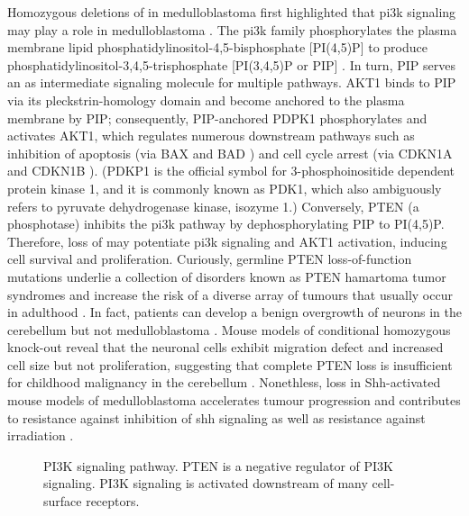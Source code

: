 Homozygous deletions of  in medulloblastoma first highlighted that \gls{pi3k} signaling  may play a role in medulloblastoma . The \gls{pi3k} family phosphorylates the plasma membrane lipid phosphatidylinositol-4,5-bisphosphate [PI(4,5)P] to produce phosphatidylinositol-3,4,5-trisphosphate [PI(3,4,5)P or PIP] . In turn, PIP serves an as intermediate signaling molecule for multiple pathways. AKT1 binds to PIP via its pleckstrin-homology domain and become anchored to the plasma membrane by PIP; consequently, PIP-anchored PDPK1 phosphorylates and activates AKT1, which regulates numerous downstream pathways such as inhibition of apoptosis (via BAX  and BAD ) and cell cycle arrest (via CDKN1A  and CDKN1B ). (PDKP1 is the official symbol for 3-phosphoinositide dependent protein kinase 1, and it is commonly known as PDK1, which also ambiguously refers to pyruvate dehydrogenase kinase, isozyme 1.) Conversely, PTEN (a phosphotase) inhibits the \gls{pi3k} pathway by dephosphorylating PIP to PI(4,5)P. Therefore, loss of  may potentiate \gls{pi3k} signaling and AKT1 activation, inducing cell survival and proliferation. Curiously, germline PTEN loss-of-function mutations underlie a collection of disorders known as PTEN hamartoma tumor syndromes and increase the risk of a diverse array of tumours that usually occur in adulthood . In fact, patients can develop a benign overgrowth of neurons in the cerebellum but not medulloblastoma . Mouse models of conditional homozygous  knock-out reveal that the neuronal cells exhibit migration defect and increased cell size but not proliferation, suggesting that complete PTEN loss is insufficient for childhood malignancy in the cerebellum . Nonethless,  loss in Shh-activated mouse models of medulloblastoma accelerates tumour progression and contributes to resistance against inhibition of \gls{shh} signaling  as well as resistance against irradiation .

\begin{figure}[H]
	\begin{center}
	\end{center}
	\caption[PI3K signaling pathway]
	{
		PI3K signaling pathway.
		PTEN is a negative regulator of PI3K signaling. PI3K signaling is activated downstream of many cell-surface receptors.
	}
	\label{fig:pi3k-pathway}
\end{figure}


